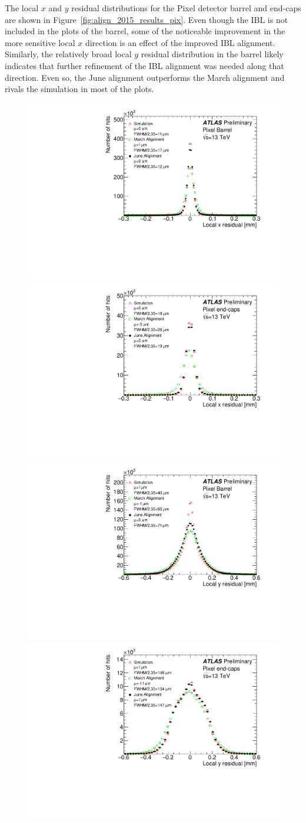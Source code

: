 The local $x$ and $y$ residual distributions for the Pixel detector barrel and end-caps are shown in Figure~\ref{fig:align_2015_results_pix}.
Even though the IBL is not included in the plots of the barrel, some of the noticeable improvement in the more sensitive local $x$ direction is an effect of the improved IBL alignment.
Similarly, the relatively broad local $y$ residual distribution in the barrel likely indicates that further refinement of the IBL alignment was needed along that direction.
Even so, the June alignment outperforms the March alignment and rivals the simulation in most of the plots.

\begin{figure}[htbp]
  \centering
  \includegraphics[width=.48\textwidth]{figs/alignment/align2015/OLDPIXX}
  \includegraphics[width=.48\textwidth]{figs/alignment/align2015/PIXECX}\\
  \includegraphics[width=.48\textwidth]{figs/alignment/align2015/OLDPIXY}
  \includegraphics[width=.48\textwidth]{figs/alignment/align2015/PIXECY}

\end{figure}
